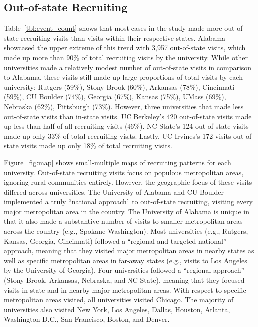\documentclass[twoside]{article}
\begin{document}
\subsection*{Out-of-state Recruiting}

Table~\ref{tbl:event_count} shows that most cases in the study made more out-of-state recruiting visits than visits within their respective states. Alabama showcased the upper extreme of this trend with 3,957 out-of-state visits, which made up more than 90\% of total recruiting visits by the university. While other universities made a relatively modest number of out-of-state visits in comparison to Alabama, these visits still made up large proportions of total visits by each university: Rutgers (59\%), Stony Brook (60\%), Arkansas (78\%), Cincinnati (59\%), CU Boulder (74\%), Georgia (67\%), Kansas (75\%), UMass (69\%), Nebraska (62\%), Pittsburgh (73\%). However, three universities that made less out-of-state visits than in-state visits. UC Berkeley's 420 out-of-state visits made up less than half of all recruiting visits (46\%). NC State's 124 out-of-state visits made up only 33\% of total recruiting visits. Lastly, UC Irvines's 172 visits out-of-state visits made up only 18\% of total recruiting visits.

Figure~\ref{fig:map} shows small-multiple maps of recruiting patterns for each university. Out-of-state recruiting visits focus on populous metropolitan areas, ignoring rural communities entirely. However, the geographic focus of these visits differed across universities. The University of Alabama and CU-Boulder implemented a truly ``national approach'' to out-of-state recruiting, visiting every major metropolitan area in the country. The University of Alabama is unique in that it also made a substantive number of visits to smaller metropolitan areas across the country (e.g., Spokane Washington). Most universities (e.g., Rutgers, Kansas, Georgia, Cincinnati) followed a ``regional and targeted national'' approach, meaning that they visited major metropolitan areas in nearby states as well as specific metropolitan areas in far-away states (e.g., visits to Los Angeles by the University of Georgia).  Four universities followed a ``regional approach'' (Stony Brook, Arkansas, Nebraska, and NC State), meaning that they focused visits in-state and in nearby major metropolitan areas.  With respect to specific metropolitan areas visited, all universities visited Chicago. The majority of universities also visited New York, Los Angeles, Dallas, Houston, Atlanta, Washington D.C., San Francisco, Boston, and Denver.
\end{document}
